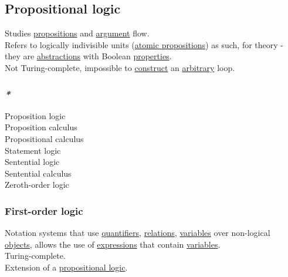 \documentclass[a4paper,14pt,oneside]{book}
\begin{document}
\subsection{\label{org8b0d7fb}Propositional logic}
\label{sec:org4753da8}
Studies \hyperref[org1d945b1]{propositions} and \hyperref[orgc64e250]{argument} flow.\\

Refers to logically indivisible units (\hyperref[orgeb2768e]{atomic propositions}) as such, for theory - they are \hyperref[org0f25814]{abstractions} with Boolean \hyperref[orge2c24e7]{properties}.\\

Not Turing-complete, impossible to \hyperref[orgdc31d44]{construct} an \hyperref[org43edc2a]{arbitrary} loop.\\

\subsubsection{\emph{*}}
\label{sec:orgee9150c}

\label{org2d2c617}Proposition logic\\
\label{orgdcecdf2}Proposition calculus\\
\label{org469ec4f}Propositional calculus\\
\label{org0c38a69}Statement logic\\
\label{org0a62a47}Sentential logic\\
\label{org768b847}Sentential calculus\\
\label{orge5696a6}Zeroth-order logic\\

\subsubsection{\label{org4fc68c1}First-order logic}
\label{sec:org80a4f66}
Notation systems that use \hyperref[orgdd911c2]{quantifiers}, \hyperref[orgd960451]{relations}, \hyperref[org1f76999]{variables} over non-logical \hyperref[orgc973d87]{objects}, allows the use of \hyperref[orgf28b2f4]{expressions} that contain \hyperref[org1f76999]{variables}.\\

Turing-complete.\\

Extension of a \hyperref[org8b0d7fb]{propositional logic}.\\
\end{document}
